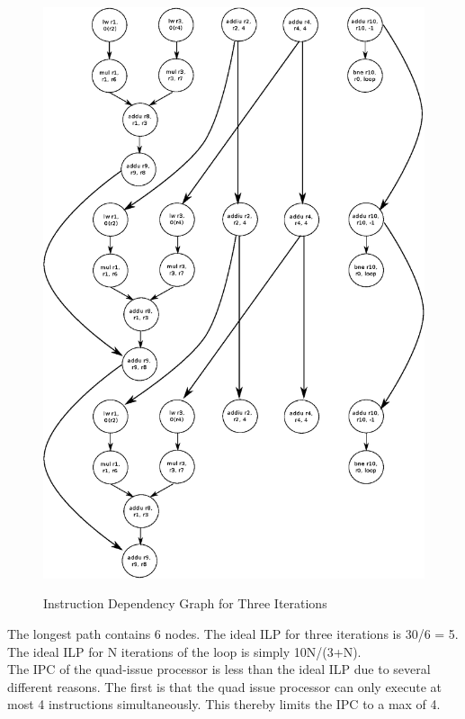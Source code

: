 \documentclass[10pt]{article}
\begin{document}
\begin{figure}[H]
\begin{center}
\includegraphics[scale=0.7]{threeiteri.eps}
\label{default}
\end{center}
\caption{Instruction Dependency Graph for Three Iterations}
\end{figure}
The longest path contains 6 nodes. 
The ideal ILP for three iterations is 30/6 = 5.\\

The ideal ILP for N iterations of the loop is simply 10N/(3+N).\\

The IPC of the quad-issue processor is less than the ideal ILP due to several different reasons. The first is that the quad issue processor can only execute at most 4 instructions simultaneously. This thereby limits the IPC to a max of 4. 
\end{document}
